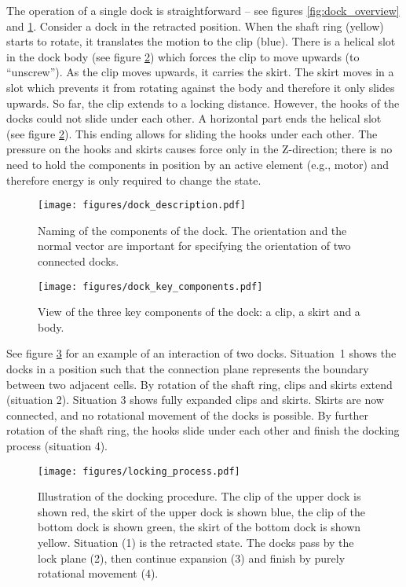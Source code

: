 The operation of a single dock is straightforward -- see figures
\ref{fig:dock_overview} and \ref{fig:dock_description}. Consider a dock in the
retracted position. When the shaft ring (yellow) starts to rotate, it translates
the motion to the clip (blue). There is a helical slot in the dock body (see
figure \ref{fig:dock_key_components}) which forces the clip to move upwards (to
``unscrew''). As the clip moves upwards, it carries the skirt. The skirt moves
in a slot which prevents it from rotating against the body and therefore it only
slides upwards. So far, the clip extends to a locking distance. However, the
hooks of the docks could not slide under each other. A horizontal part ends the
helical slot (see figure \ref{fig:dock_key_components}). This ending allows for
sliding the hooks under each other. The pressure on the hooks and skirts causes
force only in the Z-direction; there is no need to hold the components in
position by an active element (e.g., motor) and therefore energy is only
required to change the state.

\begin{figure}[t]
    \centering
    \texttt{[image: figures/dock\_description.pdf]}
    \caption{Naming of the components of the dock. The orientation and the
    normal vector are important for specifying the orientation of two connected
    docks. }
    \label{fig:dock_description}
\end{figure}

\begin{figure}[t]
    \centering
    \texttt{[image: figures/dock\_key\_components.pdf]}
    \caption{View of the three key components of the dock: a clip, a skirt and
    a body.}
    \label{fig:dock_key_components}
\end{figure}

See figure \ref{fig:dock_locking_process} for an example of an interaction of
two docks. Situation~1 shows the docks in a position such that the connection
plane represents the boundary between two adjacent cells. By rotation of the
shaft ring, clips and skirts extend (situation 2). Situation 3 shows fully
expanded clips and skirts. Skirts are now connected, and no rotational movement
of the docks is possible. By further rotation of the shaft ring, the hooks slide
under each other and finish the docking process (situation 4).

\begin{figure}[!ht]
    \centering
    \texttt{[image: figures/locking\_process.pdf]}
    \caption{Illustration of the docking procedure. The clip of the upper dock
    is shown red, the skirt of the upper dock is shown blue, the clip of the
    bottom dock is shown green, the skirt of the bottom dock is shown yellow.
    Situation (1) is the retracted state. The docks pass by the lock plane (2),
    then continue expansion (3) and finish by purely rotational movement (4). }
    \label{fig:dock_locking_process}
\end{figure}


